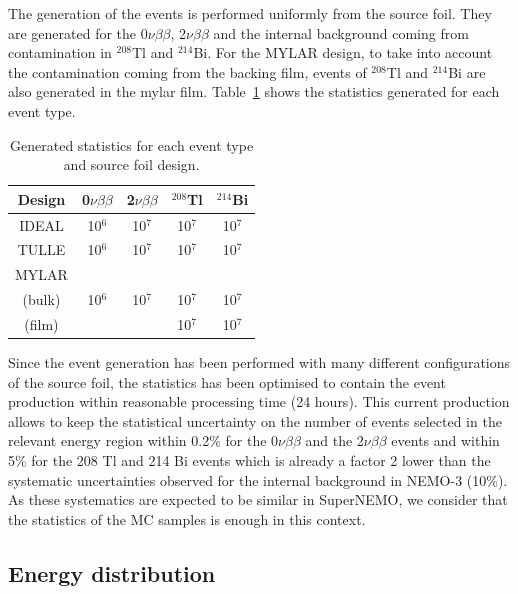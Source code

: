 \documentclass[main.tex]{subfiles}
\begin{document}
\NI The generation of the events is performed uniformly from the source foil. They are generated for the 0$\nu\beta\beta$, 2$\nu\beta\beta$ and the internal background coming from contamination in $^{\text{208}}$Tl and $^{\text{214}}$Bi. For the MYLAR design, to take into account the contamination coming from the backing film, events of $^{\text{208}}$Tl and $^{\text{214}}$Bi are also generated in the mylar film. Table~\ref{Tab:GeneratedEventSource} shows the statistics generated for each event type. 


\begin{table}[h!]
\centering
\begin{tabular}{c|c|c|c|c}
Design & 0$\nu\beta\beta$ & 2$\nu\beta\beta$ & $^{\text{208}}$Tl & $^{\text{214}}$Bi  \\[0.1cm]
\toprule
IDEAL & 10$^{\text{6}}$ & 10$^{\text{7}}$ & 10$^{\text{7}}$ & 10$^{\text{7}}$  \\[0.02cm]
TULLE & 10$^{\text{6}}$ & 10$^{\text{7}}$ & 10$^{\text{7}}$ & 10$^{\text{7}}$  \\[0.02cm]
MYLAR &                 &                 &                 &                  \\[0.02cm]
(bulk)& 10$^{\text{6}}$ & 10$^{\text{7}}$ & 10$^{\text{7}}$ & 10$^{\text{7}}$  \\[0.02cm]
(film)&                 &                 & 10$^{\text{7}}$ & 10$^{\text{7}}$  \\[0.02cm]
\bottomrule
\end{tabular}
\caption{Generated statistics for each event type and source foil design.}
\label{Tab:GeneratedEventSource}
\end{table}


\NI Since the event generation has been performed with many different configurations of the source foil, the statistics has been optimised to contain the event production within reasonable processing time (24 hours).  This current production allows to keep the statistical uncertainty on the number of events selected in the relevant energy region within 0.2\% for the 0$\nu\beta\beta$ and the 2$\nu\beta\beta$ events and within 5\% for the 208 Tl and 214 Bi events which is already a factor 2 lower than the systematic uncertainties observed for the internal background in NEMO-3 (10\%). As these systematics are expected to be similar in SuperNEMO, we consider that the statistics of the MC samples is enough in this context.


\subsection{Energy distribution}\label{sec:EventsEnergyDistribution}
\end{document}
